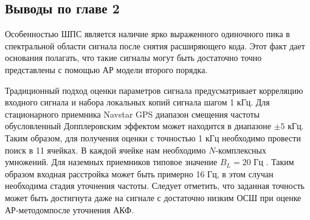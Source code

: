\subsection*{Выводы по главе 2}

Особенностью ШПС является наличие ярко выраженного одиночного пика в спектральной области сигнала после снятия расширяющего кода.
Этот факт дает основания полагать, что такие сигналы могут быть достаточно точно представлены с помощью АР модели второго порядка.

Традиционный подход оценки параметров сигнала предусматривает корреляцию входного сигнала и набора локальных копий сигнала шагом 1 кГц.
Для стационарного приемника Navstar GPS диапазон смещения частоты обусловленный Допплеровским эффектом \cite{tsui} может находится в
диапазоне ${\pm 5}$ кГц. Таким образом, для получения оценки с точностью 1 кГц необходимо провести поиск в 11 ячейках.
В каждой ячейке нам необходимо ${N}$-комплексных умножений. Для наземных приемников типовое значение  ${B_L=20}$ Гц
\cite{tsui, akos-book}. Таким образом входная расстройка может быть примерно 16 Гц, в этом случан необходима стадия уточнения частоты.
Следует отметить, что заданная точность может быть достигнута даже на сигнале с достаточно низким ОСШ при оценке АР-методомпосле
уточнения АКФ.

\newpage
